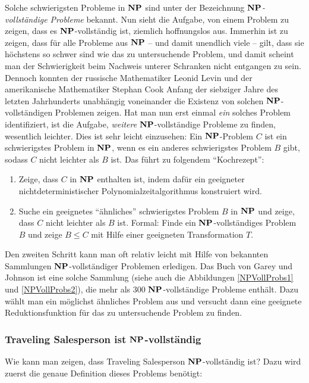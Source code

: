 Solche schwierigsten Probleme in $\mathbf{N}\mathbf{P}$ sind unter der Bezeichnung
\emph{$\mathbf{N}\mathbf{P}$-vollständige Probleme}
bekannt. Nun sieht die Aufgabe, von einem Problem zu zeigen, dass es
$\mathbf{N}\mathbf{P}$-vollständig ist, ziemlich hoffnungslos aus. Immerhin ist zu
zeigen, dass für alle Probleme aus $\mathbf{N}\mathbf{P}$ -- und damit unendlich viele
-- gilt, dass sie höchstens so schwer sind wie das zu untersuchende
Problem, und damit scheint man der Schwierigkeit beim Nachweis unterer
Schranken nicht entgangen zu sein. Dennoch konnten der russische
Mathematiker Leonid Levin und der amerikanische Mathematiker Stephan
Cook Anfang der siebziger Jahre des letzten Jahrhunderts unabhängig
voneinander die Existenz von solchen $\mathbf{N}\mathbf{P}$-vollständigen Problemen
zeigen. Hat man nun erst einmal \emph{ein} solches Problem
identifiziert, ist die Aufgabe, \emph{weitere} $\mathbf{N}\mathbf{P}$-vollständige
Probleme zu finden, wesentlich leichter. Dies ist sehr leicht
einzusehen: Ein $\mathbf{N}\mathbf{P}$-Problem $C$ ist ein schwierigstes Problem in
$\mathbf{N}\mathbf{P}$, wenn es ein anderes schwierigstes Problem $B$ gibt, sodass $C$
nicht leichter als $B$ ist.  Das führt zu folgendem "`Kochrezept"':
\medskip

\begin{enumerate}[{\sffamily(1)}]
\item Zeige, dass $C$ in $\mathbf{N}\mathbf{P}$ enthalten ist, indem dafür ein
geeigneter nichtdeterministischer Polynomialzeitalgorithmus
konstruiert wird.
\item Suche ein geeignetes "`ähnliches"' schwierigstes Problem $B$ in
$\mathbf{N}\mathbf{P}$ und zeige, dass $C$ nicht leichter als $B$ ist. Formal: Finde ein
$\mathbf{N}\mathbf{P}$-vollständiges Problem $B$ und zeige $B \le C$ mit Hilfe einer
geeigneten Transformation $T$.
\end{enumerate}

Den zweiten Schritt kann man oft relativ leicht mit Hilfe von
bekannten Sammlungen $\mathbf{N}\mathbf{P}$-vollständiger Problemen erledigen. Das Buch
von Garey und Johnson \cite{GaJo79} ist eine solche Sammlung (siehe
auch die Abbildungen \ref{NPVollProbs1} und \ref{NPVollProbs2}), die
mehr als $300$ $\mathbf{N}\mathbf{P}$-vollständige Probleme enthält. Dazu wählt man ein
möglichst ähnliches Problem aus und versucht dann eine geeignete
Reduktionsfunktion für das zu untersuchende Problem zu finden.

\goodbreak
{}
\subsubsection{Traveling Salesperson ist $\mathbf{N}\mathbf{P}$-vollständig}
Wie kann man zeigen, dass Traveling Salesperson $\mathbf{N}\mathbf{P}$-vollständig ist?
Dazu wird zuerst die genaue Definition dieses Problems benötigt:

